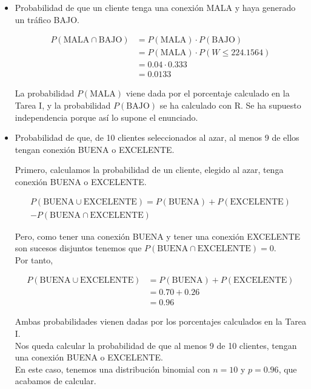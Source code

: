 \documentclass[12pt,a4paper,twoside,openright,titlepage,final]{article}
\begin{document}
\begin{itemize}
\item Probabilidad de que un cliente tenga una conexión MALA y haya generado un tráfico BAJO.

\begin{align*}
P(\text{MALA} \cap \text{BAJO}) &=  P(\text{MALA}) \cdot P(\text{BAJO})\\ &= P(\text{MALA}) \cdot P(W \leq 224.1564)\\ &= 0.04 \cdot 0.333 \\ &= 0.0133
\end{align*}

La probabilidad $P(\text{MALA})$ viene dada por el porcentaje calculado en la Tarea I, y la probabilidad $P(\text{BAJO})$ se ha calculado con R. Se ha supuesto independencia porque así lo supone el enunciado.

\item Probabilidad de que, de 10 clientes seleccionados al azar, al menos 9 de ellos tengan conexión BUENA o EXCELENTE.

Primero, calculamos la probabilidad de un cliente, elegido al azar, tenga conexión BUENA o EXCELENTE.

\begin{multline*}
P(\text{BUENA} \cup \text{EXCELENTE}) = P(\text{BUENA}) + P(\text{EXCELENTE}) \\ - P(\text{BUENA} \cap \text{EXCELENTE})
\end{multline*}

Pero, como tener una conexión BUENA y tener una conexión EXCELENTE son sucesos disjuntos tenemos que $P(\text{BUENA} \cap \text{EXCELENTE}) = 0$.\\

Por tanto, 

\begin{align*}
P(\text{BUENA} \cup \text{EXCELENTE}) &= P(\text{BUENA}) + P(\text{EXCELENTE}) \\ &= 0.70 + 0.26 \\ &= 0.96
\end{align*}

Ambas probabilidades vienen dadas por los porcentajes calculados en la Tarea I.\\

Nos queda calcular la probabilidad de que al menos 9 de 10 clientes, tengan una conexión BUENA o EXCELENTE.\\

En este caso, tenemos una distribución binomial con $n = 10$ y $p = 0.96$, que acabamos de calcular.\\


\end{itemize}
\end{document}
